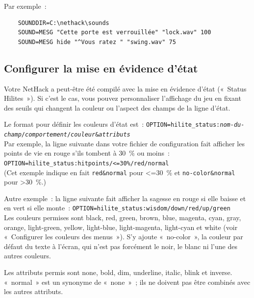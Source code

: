 \documentclass[titlepage]{article}
\begin{document}
Par exemple~:
\begin{verbatim}
    SOUNDDIR=C:\nethack\sounds
    SOUND=MESG "Cette porte est verrouillée" "lock.wav" 100
    SOUND=MESG hide "^Vous ratez " "swing.wav" 75
\end{verbatim}
\medskip

\subsection{Configurer la mise en évidence d'état}



Votre NetHack a peut-être été compilé avec la mise en évidence d'état
(«~Status Hilites~»).
Si c'est le cas, vous pouvez personnaliser l'affichage du jeu en fixant
des seuils qui changent la couleur ou l'aspect des champs de la ligne
d'état.


Le format pour définir les couleurs d'état est~:
\texttt{OPTION=hilite\_status:\textit{nom-du-champ}/\textit{comportement}/\textit{couleur}\&\textit{attributs}}\\


Par exemple, la ligne suivante dans votre fichier de configuration fait
afficher les points de vie en rouge s'ils tombent à 30~\% ou moins~:
\texttt{OPTION=hilite\_status:hitpoints/\textless{}=30\%/red/normal}\\
(Cet exemple indique en fait \texttt{red\&normal} pour \textless{}=30~\% et
\texttt{no-color\&normal} pour \textgreater{}30~\%.)


Autre exemple~: la ligne suivante fait afficher la sagesse en rouge si
elle baisse et en vert si elle monte~:
\texttt{OPTION=hilite\_status:wisdom/down/red/up/green}\\


Les couleurs permises sont black, red, green, brown, blue, magenta, cyan,
gray, orange, light-green, yellow, light-blue, light-magenta, light-cyan et
white (voir «~Configurer les couleurs des menus~»).
S'y ajoute «~no-color~», la couleur par défaut du texte à
l'écran, qui n'est pas forcément le noir, le blanc ni l'une des autres
couleurs.


Les attributs permis sont none, bold, dim, underline, italic, blink et
inverse.
«~normal~» est un synonyme de «~none~»~; ils ne doivent
pas être combinés avec les autres attributs.
\end{document}
